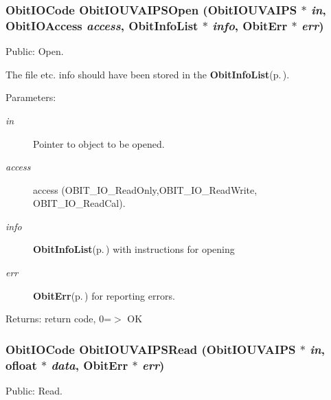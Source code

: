 \subsubsection{\setlength{\rightskip}{0pt plus 5cm}Obit\-IOCode Obit\-IOUVAIPSOpen ({\bf Obit\-IOUVAIPS} $\ast$ {\em in}, Obit\-IOAccess {\em access}, {\bf Obit\-Info\-List} $\ast$ {\em info}, {\bf Obit\-Err} $\ast$ {\em err})}\label{ObitIOUVAIPS_8h_a10}


Public: Open. 

The file etc. info should have been stored in the {\bf Obit\-Info\-List}{\rm (p.\,\pageref{structObitInfoList})}. \begin{Desc}
\item[Parameters:]
\begin{description}
\item[{\em in}]Pointer to object to be opened. \item[{\em access}]access (OBIT\_\-IO\_\-Read\-Only,OBIT\_\-IO\_\-Read\-Write, OBIT\_\-IO\_\-Read\-Cal). \item[{\em info}]{\bf Obit\-Info\-List}{\rm (p.\,\pageref{structObitInfoList})} with instructions for opening \item[{\em err}]{\bf Obit\-Err}{\rm (p.\,\pageref{structObitErr})} for reporting errors. \end{description}
\end{Desc}
\begin{Desc}
\item[Returns:]return code, 0=$>$ OK \end{Desc}
\subsubsection{\setlength{\rightskip}{0pt plus 5cm}Obit\-IOCode Obit\-IOUVAIPSRead ({\bf Obit\-IOUVAIPS} $\ast$ {\em in}, {\bf ofloat} $\ast$ {\em data}, {\bf Obit\-Err} $\ast$ {\em err})}\label{ObitIOUVAIPS_8h_a13}


Public: Read. 

